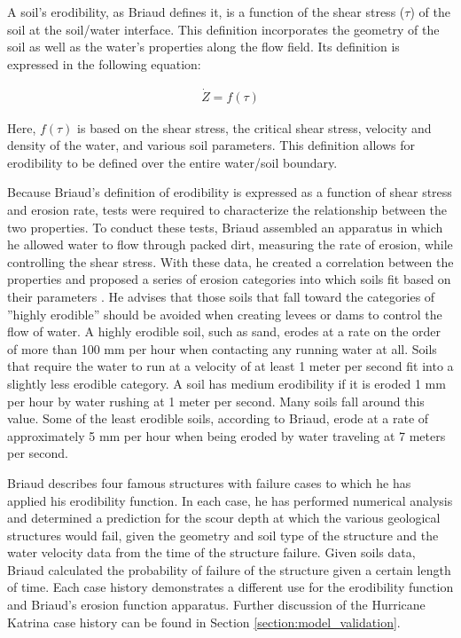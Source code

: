 A soil's erodibility, as Briaud defines it, is a function of the shear stress ($\tau$) of the soil at the soil/water interface. This definition incorporates the geometry of the soil as well as the water's properties along the flow field. Its definition is expressed in the following equation:

\begin{align}
	\dot{Z} = f\left(\tau\right)
\end{align}

Here, $f\left(\tau\right)$ is based on the shear stress, the critical shear stress, velocity and density of the water, and various soil parameters. This definition allows for erodibility to be defined over the entire water/soil boundary. 

Because Briaud's definition of erodibility is expressed as a function of shear stress and erosion rate, tests were required to characterize the relationship between the two properties. To conduct these tests, Briaud assembled an apparatus in which he allowed water to flow through packed dirt, measuring the rate of erosion, while controlling the shear stress. With these data, he created a correlation between the properties and proposed a series of erosion categories into which soils fit based on their parameters \cite{Briaud-ErosionByOvertopping}. He advises that those soils that fall toward the categories of ''highly erodible'' should be avoided when creating levees or dams to control the flow of water. A highly erodible soil, such as sand, erodes at a rate on the order of more than 100 mm per hour when contacting any running water at all. Soils that require the water to run at a velocity of at least 1 meter per second fit into a slightly less erodible category. A soil has medium erodibility if it is eroded 1 mm per hour by water rushing at 1 meter per second. Many soils fall around this value. Some of the least erodible soils, according to Briaud, erode at a rate of approximately 5 mm per hour when being eroded by water traveling at 7 meters per second.

Briaud \cite{Briaud-CaseHistories} describes four famous structures with failure cases to which he has applied his erodibility function. In each case, he has performed numerical analysis and determined a prediction for the scour depth at which the various geological structures would fail, given the geometry and soil type of the structure and the water velocity data from the time of the structure failure. Given soils data, Briaud calculated the probability of failure of the structure given a certain length of time. Each case history demonstrates a different use for the erodibility function and Briaud's erosion function apparatus. Further discussion of the Hurricane Katrina case history can be found in Section \ref{section:model_validation}.

